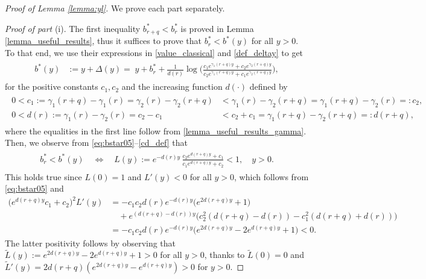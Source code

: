 \documentclass[10pt,a4paper]{amsart}
\begin{document}
\begin{proof}[Proof of Lemma \ref{lemma:yl}]
We prove each part separately. 

\vspace{1mm}
{\it Proof of part} (i).
The first inequality $b^*_{r+q} < b^*_r$ is proved in Lemma \ref{lemma_useful_results}, thus it suffices to prove that $b^*_r < b^*(y)$ for all $y > 0$. 
To that end, we use their expressions in \eqref{value_classical} and \eqref{def_deltay} to get  
\begin{align}\label{eq:bstar05}
\begin{split}    
b^*(y) &:= y +\Delta(y) 
= \; y + b^*_r + \frac{1}{d(r)} \log\Big( \frac{c_1 e^{\gamma_1(r+q)y} + c_2 e^{\gamma_2(r+q)y}}{c_2 e^{\gamma_1(r+q)y} + c_1 e^{\gamma_2(r+q)y}} \Big),
\end{split}    
\end{align}
for the positive constants $c_1, c_2$ and the increasing function $d(\cdot)$ defined by 
\begin{align}\label{cd_def}
\begin{split}
0 < c_1 := \gamma_1(r+q) - \gamma_1(r) = \gamma_2(r) - \gamma_2(r + q) &< \gamma_1(r) - \gamma_2(r+q) = \gamma_1(r+q) - \gamma_2(r) =: c_2,\\
0 < d(r) := \gamma_1(r) - \gamma_2(r) = c_2 - c_1 &< c_2 + c_1 = \gamma_1(r+q) - \gamma_2(r+q) =: d(r+q),
\end{split}
\end{align}
where the equalities in the first line follow from \eqref{lemma_useful_results_gamma}.
Then, we observe from \eqref{eq:bstar05}--\eqref{cd_def} that
\begin{align*}
\begin{split}
b^*_r < b^*(y)
\quad \Leftrightarrow \quad 
L(y) := e^{- d(r) y} \, \frac{c_2 e^{d(r+q)y} + c_1}{c_1 e^{d(r+q)y} + c_2} < 1 ,
\quad y>0 .
\end{split}    
\end{align*}
This holds true since $L(0)=1$ and $L'(y)<0$ for all $y>0$, which follows from \eqref{eq:bstar05} and 
\begin{align*}
\big(e^{d(r+q)y}c_1 + c_2 \big)^2 L'(y) 
&= - c_1 c_2 d(r) e^{-d(r)y} \big(e^{2d(r+q)y} + 1 \big) \\ 
&\quad + e^{(d(r+q)-d(r))y} \big(c_2^2 (d(r+q)-d(r)) -c_1^2 (d(r+q)+d(r)) \big) \\
&= -c_1 c_2 d(r) e^{-d(r)y} \big(e^{2d(r+q)y} - 2e^{d(r+q)y} + 1 \big) < 0.
\end{align*}
The latter positivity follows by observing that $\widetilde L(y):=e^{2d(r+q)y} - 2e^{d(r+q)y} + 1 > 0$ for all $y>0$, thanks to $\widetilde L(0)=0$ and $\widetilde L'(y) = 2d(r+q)\left(e^{2d(r+q)y} -e^{d(r+q)y}\right) > 0$ for $y > 0$.


\end{proof}
\end{document}
